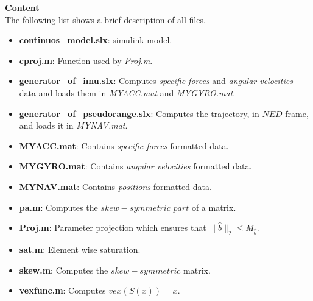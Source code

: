 \documentclass[12pt, a4paper]{article}
\begin{document}
	\textbf{\huge{Content}}\\
	
	The following list shows a brief description of all files.
	
	\begin{itemize}
		\item \textbf{continuos\_model.slx}: simulink model.
		\item \textbf{cproj.m}: Function used by \textit{Proj.m}.
		\item \textbf{generator\_of\_imu.slx}: Computes \textit{specific forces} and \textit{angular velocities} data and loads them in \textit{MYACC.mat} and \textit{MYGYRO.mat}.
		\item \textbf{generator\_of\_pseudorange.slx}: Computes the trajectory, in $NED$ frame, and loads it in \textit{MYNAV.mat}.
		\item \textbf{MYACC.mat}: Contains \textit{specific forces} formatted data.
		\item \textbf{MYGYRO.mat}: Contains \textit{angular velocities} formatted data. 
		\item \textbf{MYNAV.mat}: Contains \textit{positions} formatted data.
		\item \textbf{pa.m}: Computes the $skew-symmetric$ $part$ of a matrix.
		\item \textbf{Proj.m}: Parameter projection which ensures that $\|\hat{b}\|_2 \leq M_{\hat{b}}$.
		\item \textbf{sat.m}: Element wise saturation.
		\item \textbf{skew.m}: Computes the $skew-symmetric$ matrix.
		\item \textbf{vexfunc.m}: Computes $vex(S(x)) = x$.
	\end{itemize}
	
	
	
	
\end{document}
